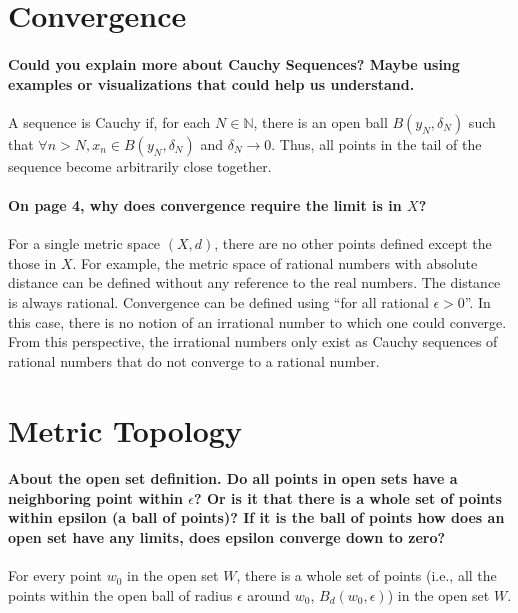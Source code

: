 \documentclass[10pt,english]{article}
\begin{document}
\section{Convergence}

\paragraph{Could you explain more about Cauchy Sequences? Maybe using examples or visualizations that could help us understand.}

A sequence is Cauchy if, for each $N\in \mathbb{N}$, there is an open ball $B(y_N,\delta_N)$ such that $\forall n> N, x_n \in B(y_N,\delta_N) $ and $\delta_N \to 0$.
Thus, all points in the tail of the sequence become arbitrarily close together.


\paragraph{On page 4, why does convergence require the limit is in $X$?}

For a single metric space $(X,d)$, there are no other points defined except the those in $X$.
For example, the metric space of rational numbers with absolute distance can be defined without any reference to the real numbers.
The distance is always rational.
Convergence can be defined using ``for all rational $\epsilon>0$''.
In this case, there is no notion of an irrational number to which one could converge.
From this perspective, the irrational numbers only exist as Cauchy sequences of rational numbers that do not converge to a rational number.

\section{Metric Topology}

\paragraph{About the open set definition. Do all points in open sets have a neighboring point within $\epsilon$? Or is it that there is a whole set of points within epsilon (a ball of points)? If it is the ball of points how does an open set have any limits, does epsilon converge down to zero?}

For every point $w_0$ in the open set $W$, there is a whole set of points (i.e., all the points within the open ball of radius $\epsilon$ around $w_0$, $B_d(w_0, \epsilon)$) in the open set $W$.
\end{document}
